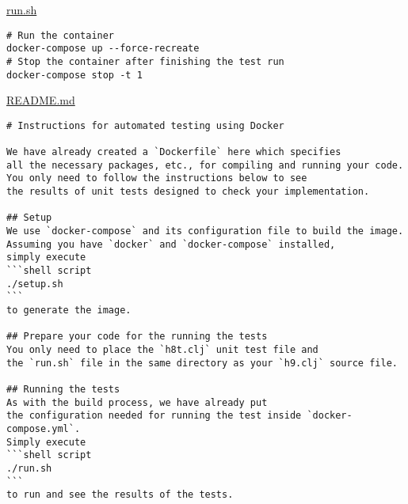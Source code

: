 \documentclass[11pt]{article}
\begin{document}
\href{./testing/h9/run.sh}{run.sh}
\begin{verbatim}
# Run the container
docker-compose up --force-recreate
# Stop the container after finishing the test run
docker-compose stop -t 1
\end{verbatim}

\href{./testing/h9/README.md}{README.md}
\begin{verbatim}
# Instructions for automated testing using Docker

We have already created a `Dockerfile` here which specifies
all the necessary packages, etc., for compiling and running your code.
You only need to follow the instructions below to see 
the results of unit tests designed to check your implementation.

## Setup
We use `docker-compose` and its configuration file to build the image.
Assuming you have `docker` and `docker-compose` installed,
simply execute
```shell script
./setup.sh
```
to generate the image.

## Prepare your code for the running the tests
You only need to place the `h8t.clj` unit test file and
the `run.sh` file in the same directory as your `h9.clj` source file.

## Running the tests
As with the build process, we have already put
the configuration needed for running the test inside `docker-compose.yml`.
Simply execute
```shell script
./run.sh
```
to run and see the results of the tests.
\end{verbatim}
\end{document}
